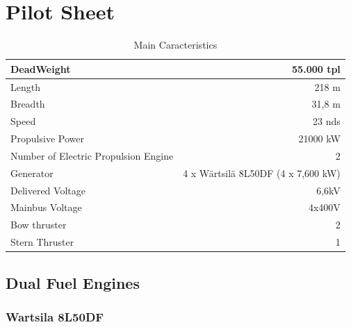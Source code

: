 \documentclass[12pt,a4paper]{article}
\begin{document}
\section{Pilot Sheet}
\begin{table}[htbp]
\begin{tabular}{|l|r|}
\hline
DeadWeight & 55.000 tpl \\ \hline
Length & 218 m \\ \hline
Breadth & 31,8 m \\ \hline
Speed & 23 nds \\ \hline
Propulsive Power & 21000 kW \\ \hline
Number of Electric Propulsion Engine & 2 \\ \hline
Generator & 4 x Wärtsilä 8L50DF (4 x 7,600 kW) \\ \hline
Delivered Voltage & 6,6kV \\ \hline
Mainbus Voltage & 4x400V \\ \hline
Bow thruster & 2 \\ \hline
Stern Thruster & 1 \\ \hline
\end{tabular}
\caption{Main Caracteristics}
\label{}
\end{table}


\subsection{Dual Fuel Engines}

\subsubsection{Wartsila 8L50DF}
\end{document}
